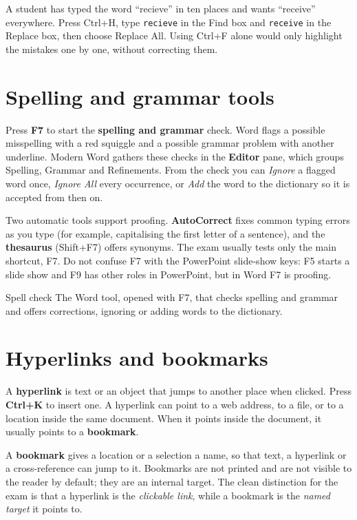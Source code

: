 \begin{example}
A student has typed the word ``recieve'' in ten places and wants ``receive''
everywhere. Press Ctrl+H, type \texttt{recieve} in the Find box and
\texttt{receive} in the Replace box, then choose Replace All. Using Ctrl+F
alone would only highlight the mistakes one by one, without correcting them.
\end{example}

\section{Spelling and grammar tools}
Press \textbf{F7} to start the \textbf{spelling and grammar} check. Word
flags a possible misspelling with a red squiggle and a possible grammar problem
with another underline. Modern Word gathers these checks in the
\textbf{Editor} pane, which groups Spelling, Grammar and Refinements. From the
check you can \emph{Ignore} a flagged word once, \emph{Ignore All} every
occurrence, or \emph{Add} the word to the dictionary so it is accepted from
then on.

Two automatic tools support proofing. \textbf{AutoCorrect} fixes common typing
errors as you type (for example, capitalising the first letter of a sentence),
and the \textbf{thesaurus} (Shift+F7) offers synonyms. The exam usually tests
only the main shortcut, F7. Do not confuse F7 with the PowerPoint slide-show
keys: F5 starts a slide show and F9 has other roles in PowerPoint, but in Word
F7 is proofing.

\begin{definitionbox}{Spell check}
The Word tool, opened with F7, that checks spelling and grammar and offers
corrections, ignoring or adding words to the dictionary.
\end{definitionbox}

\section{Hyperlinks and bookmarks}
A \textbf{hyperlink} is text or an object that jumps to another place when
clicked. Press \textbf{Ctrl+K} to insert one. A hyperlink can point to a web
address, to a file, or to a location inside the same document. When it points
inside the document, it usually points to a \textbf{bookmark}.

A \textbf{bookmark} gives a location or a selection a name, so that text,
a hyperlink or a cross-reference can jump to it. Bookmarks are not printed and
are not visible to the reader by default; they are an internal target. The
clean distinction for the exam is that a hyperlink is the \emph{clickable link},
while a bookmark is the \emph{named target} it points to.

